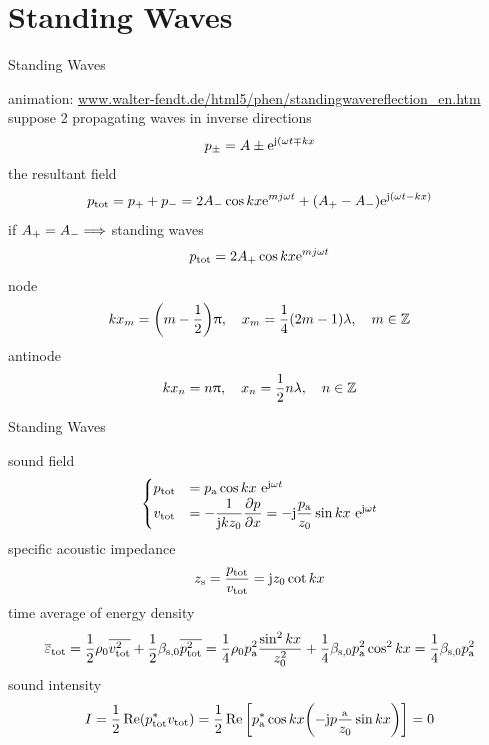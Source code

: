 \documentclass[9pt,mathserif]{beamer}
\begin{document}
\section{Standing Waves}
\begin{frame}{Standing Waves}
	\begin{outline}
		\1 animation: \url{www.walter-fendt.de/html5/phen/standingwavereflection_en.htm}
		\1 suppose 2 propagating waves in inverse directions
		$$p_\pm = A\pm \mathrm{e}^{\mathrm{j} (\omega t \mp kx }$$
		\1 the resultant field
		$$ p_\text{tot} = p_+ + p_- = 2A_- \cos kx \mathrm{e}^{mj \omega t}
		+(A_+ - A_- ) \mathrm{e}^{\mathrm{j} (\omega t - kx)}$$
		\1 if $A_+=A_- \Longrightarrow$ standing waves
		$$p_\text{tot} = 2A_+ \cos kx \mathrm{e}^{mj \omega t}$$
		\1 node
		$$kx_m = \qty(m-\frac12)\uppi \qc x_m = \frac14(2m-1)\lambda\qc m\in \Z$$
		\1 antinode
		$$kx_n = n\uppi\qc x_n=\frac12 n\lambda\qc n\in \Z$$
	\end{outline}
\end{frame}

\begin{frame}{Standing Waves}
	\begin{outline}
		\1 sound field
		$$\begin{cases}
			p_\text{tot} & = p_\text{a} \cos kx\ \mathrm{e}^{\mathrm{j} \omega t}\\
			v_\text{tot} & = -\dfrac{1}{\mathrm{j} k z_0}\displaystyle\pdv{p}{x} 
			= -\mathrm{j} \frac{p_\text{a}}{z_0}\sin
			kx\ \mathrm{e}^{\mathrm{j} \omega t}
		\end{cases}
		$$
		\1 specific acoustic impedance
		$$z_\text{s} = \frac{p_\text{tot}}{v_\text{tot}}
		=\mathrm{j} z_0 \cot kx$$
		\1 time average of energy density
		$$\overline{\varepsilon}_\text{tot} = \frac12 \rho_0 \overline{v^2_\text{tot}}
		+\frac12\beta_{\mathrm{s},0} \overline{p^2_\text{tot}}
		=\frac14 \rho_0 p_\text{a}^2 \dfrac{\sin^2 kx}{z_0^2} +
		\frac14 \beta_{\mathrm{s},0} p_\text{a}^2 \cos^2 kx = \frac14
		\beta_\text{s,0} p_\text{a}^2$$
		\1 sound intensity
		$$I = \frac12 \Re(p^*_\text{tot} v_\text{tot}) = \frac12 \Re\qty[p_\text{a}^*
		\cos kx \qty(-\mathrm{j} p\frac{_\text{a}}{z_0} \sin kx)]=0$$

	\end{outline}
\end{frame}
\end{document}
